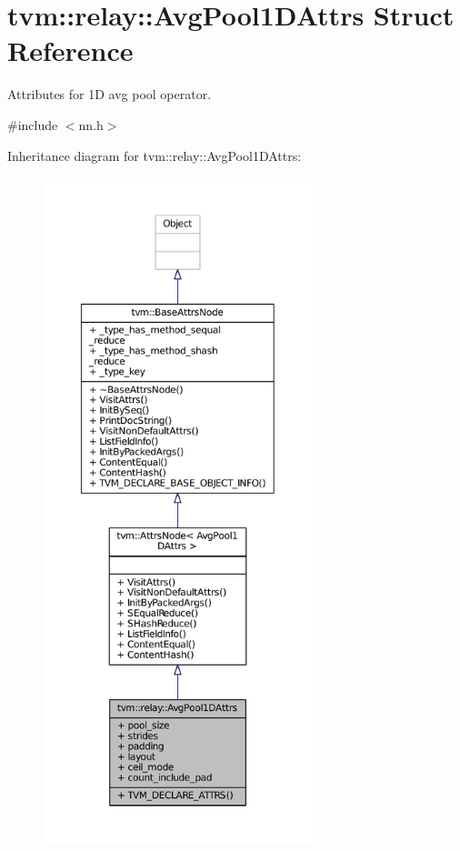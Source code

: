 \hypertarget{structtvm_1_1relay_1_1AvgPool1DAttrs}{}\section{tvm\+:\+:relay\+:\+:Avg\+Pool1\+D\+Attrs Struct Reference}
\label{structtvm_1_1relay_1_1AvgPool1DAttrs}


Attributes for 1D avg pool operator.  




{\ttfamily \#include $<$nn.\+h$>$}



Inheritance diagram for tvm\+:\+:relay\+:\+:Avg\+Pool1\+D\+Attrs\+:
\nopagebreak
\begin{figure}[H]
\begin{center}
\leavevmode
\includegraphics[height=550pt]{structtvm_1_1relay_1_1AvgPool1DAttrs__inherit__graph}
\end{center}
\end{figure}


